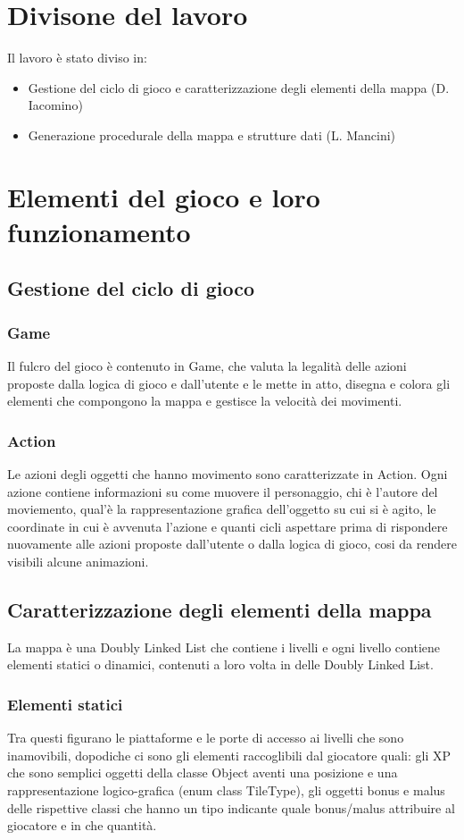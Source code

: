 \documentclass[12pt]{article}
\begin{document}
\section*{Divisone del lavoro}
Il lavoro è stato diviso in:
\begin{itemize}
    \item Gestione del ciclo di gioco e caratterizzazione degli elementi della mappa (D. Iacomino)
    \item Generazione procedurale della mappa e strutture dati (L. Mancini)
\end{itemize}

\section*{Elementi del gioco e loro funzionamento}
\subsection*{Gestione del ciclo di gioco}
\subsubsection{Game}
Il fulcro del gioco è contenuto in Game, che valuta la legalità delle azioni proposte dalla logica di gioco e dall'utente e le mette in atto, disegna e colora gli elementi che compongono la mappa e gestisce la velocità dei movimenti.
\subsubsection{Action}
Le azioni degli oggetti che hanno movimento sono caratterizzate in Action. Ogni azione contiene informazioni su come muovere il personaggio, chi è l'autore del moviemento, qual'è la rappresentazione grafica dell'oggetto su cui si è agito, le coordinate in cui è avvenuta l'azione e quanti cicli aspettare prima di rispondere nuovamente alle azioni proposte dall'utente o dalla logica di gioco, cosi da rendere visibili alcune animazioni.
\pagebreak

\subsection{Caratterizzazione degli elementi della mappa}
La mappa è una Doubly Linked List che contiene i livelli e ogni livello contiene elementi statici o dinamici, contenuti a loro volta in delle Doubly Linked List.

\subsubsection{Elementi statici}
Tra questi figurano le piattaforme e le porte di accesso ai livelli che sono inamovibili, dopodiche ci sono gli elementi raccoglibili dal giocatore quali: gli XP che sono semplici oggetti della classe Object aventi una posizione e una rappresentazione logico-grafica (enum class TileType), gli oggetti bonus e malus delle rispettive classi che hanno un tipo indicante quale bonus/malus attribuire al giocatore e in che quantità.
\end{document}
